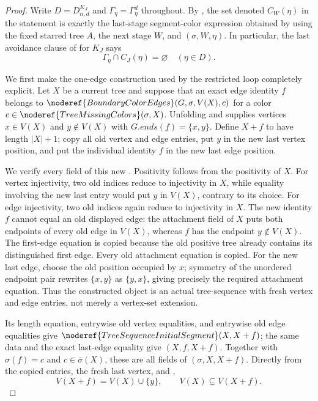 \begin{proof}
Write $D=D^{K_J}_{n,d}$ and $\Gamma_\eta=\Gamma^d_\eta$ throughout.
By , the set denoted $C_W(\eta)$ in the
statement is exactly the last-stage segment-color expression obtained by
using the fixed starred tree $A$, the next stage $W$, and
$(\sigma,W,\eta)$.  In particular,
the last avoidance clause of  for $K_J$ says
\[
                    \Gamma_\eta\cap C_J(\eta)=\varnothing
                    \quad(\eta\in D).                 \tag{1}
\]

We first make the one-edge construction used by the restricted loop
completely explicit.  Let $X$ be a current tree and suppose that an exact
edge identity $f$ belongs to
$\noderef{BoundaryColorEdges}(G,\sigma,V(X),c)$ for a color
$c\in\noderef{TreeMissingColors}(\sigma,X)$.  Unfolding
 and  supplies vertices
$x\in V(X)$ and $y\notin V(X)$ with
$G.\mathit{ends}(f)=\{x,y\}$.  Define $X+f$ to have length $|X|+1$; copy
all old vertex and edge entries, put $y$ in the new last vertex position,
and put the individual identity $f$ in the new last edge position.

We verify every field of this new .  Positivity
follows from the positivity of $X$.  For vertex injectivity, two old
indices reduce to injectivity in $X$, while equality involving the new
last entry would put $y$ in $V(X)$, contrary to its choice.  For edge
injectivity, two old indices again reduce to injectivity in $X$.  The new
identity $f$ cannot equal an old displayed edge: the attachment field of
$X$ puts both endpoints of every old edge in $V(X)$, whereas $f$ has the
endpoint $y\notin V(X)$.  The first-edge equation is copied because the
old positive tree already contains its distinguished first edge.  Every
old attachment equation is copied.  For the new last edge, choose the old
position occupied by $x$; symmetry of the unordered endpoint pair rewrites
$\{x,y\}$ as $\{y,x\}$, giving precisely the required attachment equation.
Thus the constructed object is an actual tree-sequence with fresh vertex
and edge entries, not merely a vertex-set extension.

Its length equation, entrywise old vertex equalities, and entrywise old
edge equalities give
$\noderef{TreeSequenceInitialSegment}(X,X+f)$; the same data and the exact
last-edge equality give $(X,f,X+f)$.
Together with $\sigma(f)=c$ and $c\in\overline\sigma(X)$, these are all
fields of $(\sigma,X,X+f)$.  Directly from
the copied entries, the fresh last vertex, and
,
\[
                V(X+f)=V(X)\cup\{y\},\qquad V(X)\subsetneq V(X+f).
                                                               \tag{2}
\]


\end{proof}
